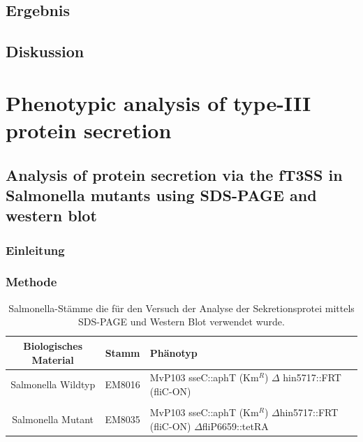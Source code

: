 \documentclass[oneside,10pt,a4paper]{report}
\begin{document}
		
		\section{Ergebnis}
		
		\section{Diskussion}
	
	\chapter{Phenotypic analysis of type-III protein secretion}
	
		\section{Analysis of protein secretion via the fT3SS in Salmonella mutants using SDS-PAGE and western blot}
	
		\subsection{Einleitung}
		
		\subsection{Methode}
			\begin{table}[H]
				\centering
				\caption{Salmonella-Stämme die für den Versuch der Analyse der Sekretionsprotei mittels SDS-PAGE und Western Blot verwendet wurde.}
				\label{tab: exp6-biologisches Material part1}
				\begin{tabular}{ccp{7.5cm}}
					\toprule
					Biologisches Material& Stamm & Phänotyp\\
					\midrule
					\multirow{2}{*}{\parbox[t]{2cm}{Salmonella Wildtyp}}  & \multirow{2}{*}{EM8016} & \multirow{2}{*}{\parbox[t]{7.5cm}{MvP103 sseC::aphT (Km$^R$) $\Delta$ hin5717::FRT (fliC-ON)}}\\
					&&\\
					&&\\
					\multirow{3}{*}{\parbox[t]{2cm}{Salmonella Mutant}} & \multirow{3}{*}{EM8035} &\multirow{3}{*}{\parbox[t]{7.5cm}{MvP103 sseC::aphT (Km$^R$) $\Delta$hin5717::FRT (fliC-ON) $\Delta$fliP6659::tetRA}} \\
					&&\\
					&&\\
					
					\bottomrule			
				\end{tabular}
			\end{table}
			
\end{document}
